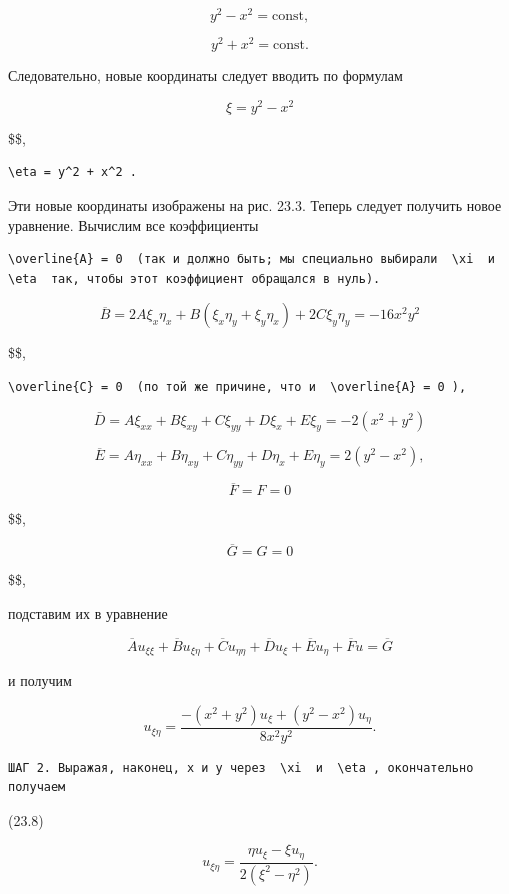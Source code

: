 \documentclass[
  ukrainian,
]{article}
\begin{document}
\[
y^2 - x^2 = \text{const},
\]

\[
y^2 + x^2 = \text{const}.
\]

Следовательно, новые координаты следует вводить по формулам

\[
\xi = y^2 - x^2
\]

\$\$,

\begin{verbatim}
\eta = y^2 + x^2 .
\end{verbatim}

Эти новые координаты изображены на рис. 23.3. Теперь следует получить
новое уравнение. Вычислим все коэффициенты

\begin{verbatim}
\overline{A} = 0  (так и должно быть; мы специально выбирали  \xi  и  \eta  так, чтобы этот коэффициент обращался в нуль).
\end{verbatim}

\[
\overline{B} = 2A\xi_x\eta_x + B(\xi_x\eta_y + \xi_y\eta_x) + 2C\xi_y\eta_y = -16x^2y^2
\]

\$\$,

\begin{verbatim}
\overline{C} = 0  (по той же причине, что и  \overline{A} = 0 ),
\end{verbatim}

\[
\bar{D} = A\xi_{xx} + B\xi_{xy} + C\xi_{yy} + D\xi_x + E\xi_y = -2(x^2 + y^2)
\]

\[
\overline{E} = A\eta_{xx} + B\eta_{xy} + C\eta_{yy} + D\eta_x + E\eta_y = 2(y^2 - x^2),
\]

\[
\overline{F} = F = 0
\]

\$\$,

\[
\overline{G} = G = 0
\]

\$\$,

подставим их в уравнение

\[
\overline{A}u_{\xi\xi} + \overline{B}u_{\xi\eta} + \overline{C}u_{\eta\eta} + \overline{D}u_{\xi} + \overline{E}u_{\eta} + \overline{F}u = \overline{G}
\]

и получим

\[
u_{\xi\eta} = \frac{-(x^2 + y^2) u_{\xi} + (y^2 - x^2) u_{\eta}}{8x^2y^2}.
\]

\begin{verbatim}
ШАГ 2. Выражая, наконец, x и y через  \xi  и  \eta , окончательно получаем
\end{verbatim}

(23.8)

\[
u_{\xi\eta} = \frac{\eta u_{\xi} - \xi u_{\eta}}{2(\xi^2 - \eta^2)}.
\]
\end{document}
